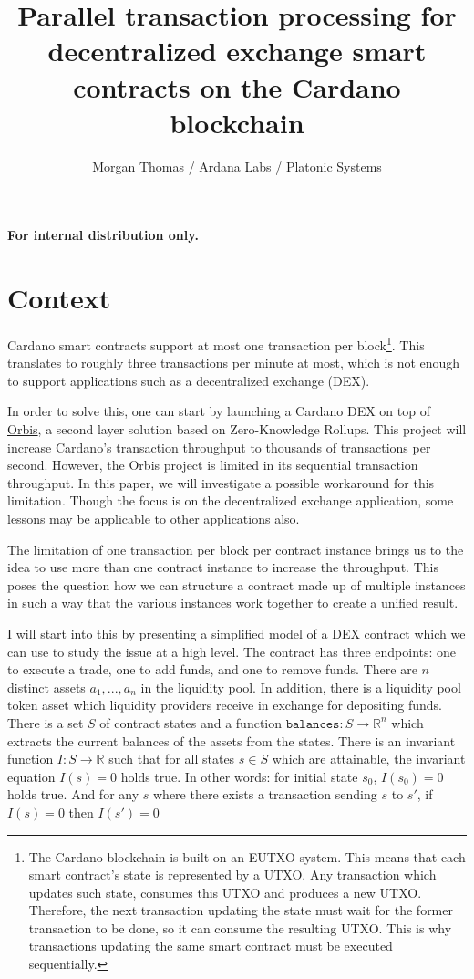 \documentclass[12pt]{article}
\title{Parallel transaction processing for decentralized exchange smart contracts on the Cardano blockchain}
\author{Morgan Thomas / Ardana Labs / Platonic Systems}
\begin{document}
\maketitle

\begin{center}
	\textbf{For internal distribution only.}
\end{center}

\section{Context}

Cardano smart contracts support at most one transaction per block\footnote{
  The Cardano blockchain is built on an EUTXO system.
  This means that each smart contract's state is represented by a UTXO.
  Any transaction which updates such state, consumes this UTXO and produces a
  new UTXO.
  Therefore, the next transaction updating the state must wait for the former
  transaction to be done, so it can consume the resulting UTXO.
  This is why transactions updating the same smart contract must be executed
  sequentially.
}.
This translates to roughly three transactions per minute at most,
which is not enough to support applications such as a decentralized exchange (DEX).

In order to solve this, one can start by launching a Cardano DEX on top of
\href{https://orbisprotocol.com/}{Orbis}, a second layer solution based on
Zero-Knowledge Rollups.
This project will increase Cardano's transaction throughput to thousands of
transactions per second.
However, the Orbis project is limited in its sequential transaction throughput.
In this paper, we will investigate a possible workaround for this limitation.
Though the focus is on the decentralized exchange application, some lessons may
be applicable to other applications also.

The limitation of one transaction per block per contract instance brings us to
the idea to use more than one contract instance to increase the throughput.
This poses the question how we can structure a contract made up of multiple
instances in such a way that the various instances work together to create a
unified result.

I will start into this by presenting a simplified model of a DEX contract which we can use to study the issue at a high level.
The contract has three endpoints: one to execute a trade, one to add funds, and one to remove funds. There are $n$ distinct
assets $a_1,...,a_n$ in the liquidity pool. In addition, there is a liquidity pool token asset which liquidity
providers receive in exchange for depositing funds. There is a set $S$ of contract states and a function $\texttt{balances} : S \to \mathbb{R}^n$
which extracts the current balances of the assets from the states. There is an invariant function $I : S \to \mathbb{R}$
such that for all states $s \in S$ which are attainable, the invariant equation $I(s) = 0$ holds true.
In other words: for initial state $s_0$, $I(s_0) = 0$ holds true. And for any $s$ where there exists a transaction sending $s$ to $s'$, if $I(s) = 0$ then $I(s') = 0$
\end{document}
